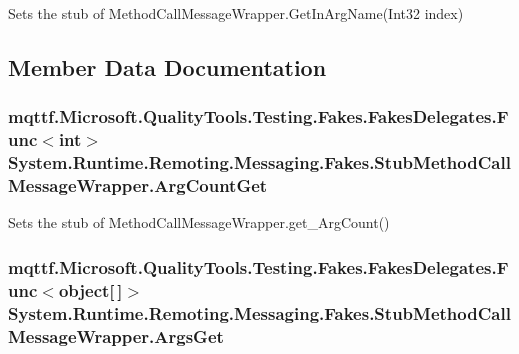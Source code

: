 Sets the stub of Method\-Call\-Message\-Wrapper.\-Get\-In\-Arg\-Name(\-Int32 index)



\subsection{Member Data Documentation}
\hypertarget{class_system_1_1_runtime_1_1_remoting_1_1_messaging_1_1_fakes_1_1_stub_method_call_message_wrapper_a304f6473aeea8f838dcc9e85ad0e0441}{
\subsubsection[{Arg\-Count\-Get}]{\setlength{\rightskip}{0pt plus 5cm}mqttf.\-Microsoft.\-Quality\-Tools.\-Testing.\-Fakes.\-Fakes\-Delegates.\-Func$<$int$>$ System.\-Runtime.\-Remoting.\-Messaging.\-Fakes.\-Stub\-Method\-Call\-Message\-Wrapper.\-Arg\-Count\-Get}}\label{class_system_1_1_runtime_1_1_remoting_1_1_messaging_1_1_fakes_1_1_stub_method_call_message_wrapper_a304f6473aeea8f838dcc9e85ad0e0441}


Sets the stub of Method\-Call\-Message\-Wrapper.\-get\-\_\-\-Arg\-Count()

\hypertarget{class_system_1_1_runtime_1_1_remoting_1_1_messaging_1_1_fakes_1_1_stub_method_call_message_wrapper_ac7c33f35ae41c7e1c9f60e9e4b895e78}{
\subsubsection[{Args\-Get}]{\setlength{\rightskip}{0pt plus 5cm}mqttf.\-Microsoft.\-Quality\-Tools.\-Testing.\-Fakes.\-Fakes\-Delegates.\-Func$<$object\mbox{[}$\,$\mbox{]}$>$ System.\-Runtime.\-Remoting.\-Messaging.\-Fakes.\-Stub\-Method\-Call\-Message\-Wrapper.\-Args\-Get}}\label{class_system_1_1_runtime_1_1_remoting_1_1_messaging_1_1_fakes_1_1_stub_method_call_message_wrapper_ac7c33f35ae41c7e1c9f60e9e4b895e78}


